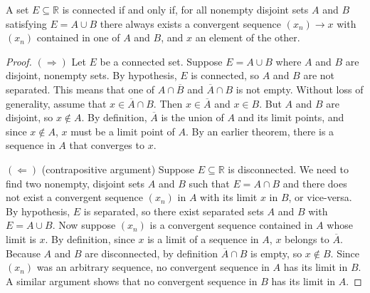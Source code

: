 \par\vspace{1 cm}
\begin{theorem*} A set $E\subseteq\mathbb{R}$ is connected if and only if, for all nonempty disjoint sets $A$ and $B$ satisfying $E=A\cup B$ there always exists a convergent sequence $(x_n)\rightarrow x$ with $(x_n)$ contained in one of $A$ and $B$, and $x$ an element of the other.
\end{theorem*}
\begin{proof}
$(\Rightarrow)$ Let $E$ be a connected set. Suppose $E=A\cup B$ where $A$ and $B$ are disjoint, nonempty sets.  By hypothesis, $E$ is connected, so $A$ and $B$ are not separated. This means that one of $A\cap\overline{B}$ and $\overline{A}\cap B$ is not empty.  Without loss of generality, assume that $x\in\overline{A}\cap B$.  Then $x\in\overline{A}$ and $x\in B$.  But $A$ and $B$ are disjoint, so $x\notin A$.  By definition, $\overline{A}$ is the union of $A$ and its limit points, and since $x\notin A$, $x$ must be a limit point of $A$.  By an earlier theorem, there is a sequence in $A$ that converges to $x$.    
\par\vspace{1 cm}
$(\Leftarrow)$ (contrapositive argument) Suppose $E\subseteq\mathbb{R}$ is disconnected.  We need to find two nonempty, disjoint sets $A$ and $B$ such that $E=A\cap B$ and there does not exist a convergent sequence $(x_n)$ in $A$ with its limit $x$ in $B$, or vice-versa.  By hypothesis, $E$ is separated, so there exist separated sets $A$ and $B$ with $E=A\cup B$. Now suppose $(x_n)$ is a convergent sequence contained in $A$ whose limit is $x$.  By definition, since $x$ is a limit of a sequence in $A$, $x$ belongs to $\overline{A}$. Because $A$ and $B$ are disconnected, by definition $\overline{A}\cap B$ is empty, so $x\notin B$.  Since $(x_n)$ was an arbitrary sequence, no convergent sequence in $A$ has its limit in $B$.  A similar argument shows that no convergent sequence in $B$ has its limit in $A$. 
\end{proof}
